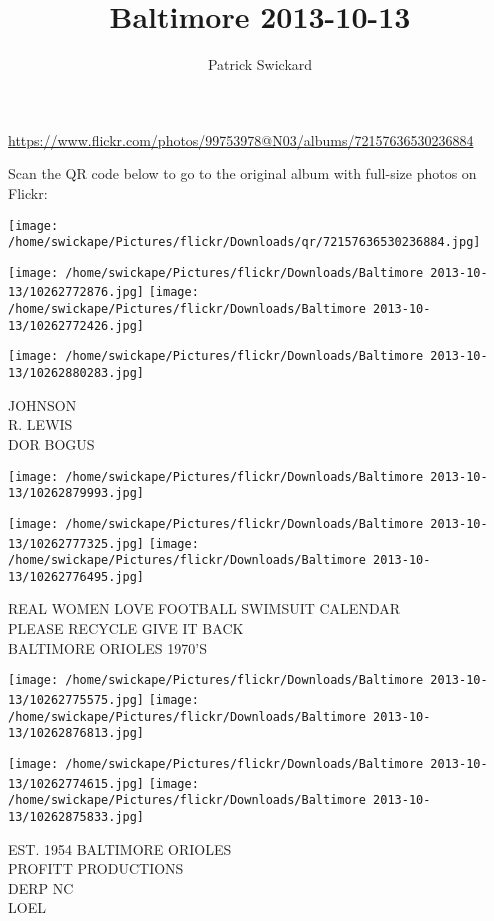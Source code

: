 \documentclass[10pt,letterpaper]{article}
\title{Baltimore 2013-10-13}
\author{Patrick Swickard}
\date{}
\begin{document}
\maketitle

\url{https://www.flickr.com/photos/99753978@N03/albums/72157636530236884}

Scan the QR code below to go to the original album with full-size photos on Flickr:

\texttt{[image: /home/swickape/Pictures/flickr/Downloads/qr/72157636530236884.jpg]}
\pagebreak

\texttt{[image: /home/swickape/Pictures/flickr/Downloads/Baltimore 2013-10-13/10262772876.jpg]}
\texttt{[image: /home/swickape/Pictures/flickr/Downloads/Baltimore 2013-10-13/10262772426.jpg]}

\vspace{0.25in}
\texttt{[image: /home/swickape/Pictures/flickr/Downloads/Baltimore 2013-10-13/10262880283.jpg]}

JOHNSON\\
R. LEWIS\\
DOR BOGUS
\pagebreak

\texttt{[image: /home/swickape/Pictures/flickr/Downloads/Baltimore 2013-10-13/10262879993.jpg]}

\vspace{0.25in}
\texttt{[image: /home/swickape/Pictures/flickr/Downloads/Baltimore 2013-10-13/10262777325.jpg]}
\texttt{[image: /home/swickape/Pictures/flickr/Downloads/Baltimore 2013-10-13/10262776495.jpg]}

REAL WOMEN LOVE FOOTBALL SWIMSUIT CALENDAR\\
PLEASE RECYCLE GIVE IT BACK\\
BALTIMORE ORIOLES 1970'S
\pagebreak

\texttt{[image: /home/swickape/Pictures/flickr/Downloads/Baltimore 2013-10-13/10262775575.jpg]}
\texttt{[image: /home/swickape/Pictures/flickr/Downloads/Baltimore 2013-10-13/10262876813.jpg]}

\texttt{[image: /home/swickape/Pictures/flickr/Downloads/Baltimore 2013-10-13/10262774615.jpg]}
\texttt{[image: /home/swickape/Pictures/flickr/Downloads/Baltimore 2013-10-13/10262875833.jpg]}

EST. 1954 BALTIMORE ORIOLES\\
PROFITT PRODUCTIONS\\
DERP NC\\
LOEL
\pagebreak
\end{document}
